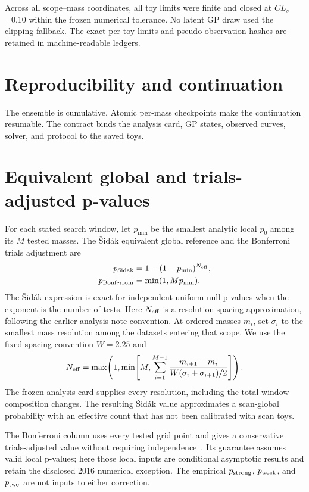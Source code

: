 \documentclass[11pt]{article}
\newcommand{\CLs}{\ensuremath{CL_s}}
\begin{document}
Across all \ScopeMassRows{} scope--mass coordinates, all \ToyLimitRows{} toy
limits were finite and closed at \CLs{}=0.10 within the frozen numerical
tolerance. No latent GP draw used the clipping fallback. The exact per-toy
limits and pseudo-observation hashes are retained in machine-readable ledgers.

\section{Reproducibility and continuation}

The ensemble is cumulative. \ContinuationText{} Atomic per-mass checkpoints make
the continuation resumable. The contract binds the analysis card, GP states,
observed curves, solver, and protocol to the saved toys.

\clearpage
\section{Equivalent global and trials-adjusted p-values}
\label{sec:global}

For each stated search window, let $p_{\min}$ be the smallest analytic local
$p_0$ among its $M$ tested masses. The \v{S}id\'ak equivalent global reference and
the Bonferroni trials adjustment are
\begin{align}
p_{\rm Sidak}&=1-(1-p_{\min})^{N_{\rm eff}},\\
p_{\rm Bonferroni}&=\min(1,Mp_{\min}).
\end{align}
The \v{S}id\'ak expression is exact for independent uniform null p-values when the
exponent is the number of tests. Here $N_{\rm eff}$ is a resolution-spacing
approximation, following the earlier analysis-note convention. At ordered masses
$m_i$, set $\sigma_i$ to the smallest mass resolution among the datasets entering
that scope. We use the fixed spacing convention $W=2.25$ and
\[
N_{\rm eff}=\max\!\left(1,\min\!\left[M,
\sum_{i=1}^{M-1}\frac{m_{i+1}-m_i}{W(\sigma_i+\sigma_{i+1})/2}
\right]\right).
\]
The frozen analysis card supplies every resolution, including the total-window
composition changes. The resulting \v{S}id\'ak value approximates a scan-global
probability with an effective count that has not been calibrated with scan toys.

The Bonferroni column uses every tested grid point and gives a conservative
trials-adjusted value without requiring independence~\cite{sas}. Its guarantee
assumes valid local p-values; here those local inputs are conditional asymptotic
results and retain the disclosed 2016 numerical exception. The empirical
$p_{\rm strong}$, $p_{\rm weak}$, and $p_{\rm two}$ are not inputs to either
correction.
\end{document}
